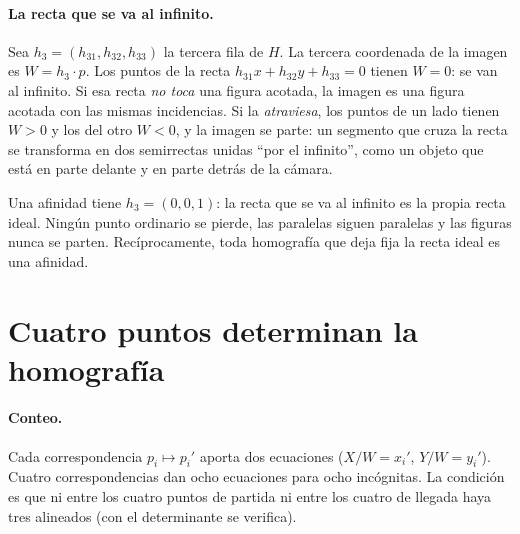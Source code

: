 \paragraph{La recta que se va al infinito.}
Sea \(h_3=(h_{31},h_{32},h_{33})\) la tercera fila de \(H\). La tercera coordenada de la
imagen es \(W=h_3\cdot p\). Los puntos de la recta \(h_{31}x+h_{32}y+h_{33}=0\) tienen
\(W=0\): se van al infinito. Si esa recta \emph{no toca} una figura acotada, la imagen es una
figura acotada con las mismas incidencias. Si la \emph{atraviesa}, los puntos de un lado
tienen \(W>0\) y los del otro \(W<0\), y la imagen se parte: un segmento que cruza la recta se
transforma en dos semirrectas unidas ``por el infinito'', como un objeto que está en parte
delante y en parte detrás de la cámara.

\begin{atencion}
Una afinidad tiene \(h_3=(0,0,1)\): la recta que se va al infinito es la propia recta ideal.
Ningún punto ordinario se pierde, las paralelas siguen paralelas y las figuras nunca se
parten. Recíprocamente, toda homografía que deja fija la recta ideal es una afinidad.
\end{atencion}

\section{Cuatro puntos determinan la homografía}\label{sec:cuatro-puntos}

\paragraph{Conteo.} Cada correspondencia \(p_i\mapsto p_i'\) aporta dos ecuaciones
(\(X/W=x_i'\), \(Y/W=y_i'\)). Cuatro correspondencias dan ocho ecuaciones para ocho
incógnitas. La condición es que ni entre los cuatro puntos de partida ni entre los cuatro de
llegada haya tres alineados (con el determinante se verifica).

